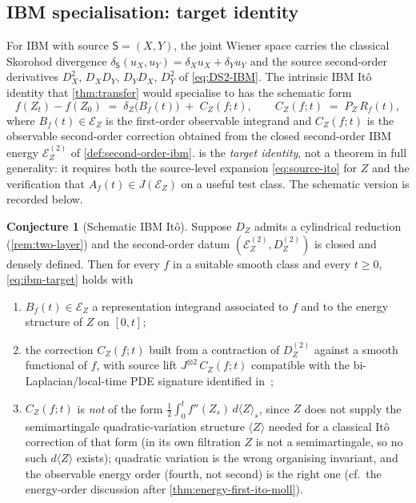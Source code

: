 \documentclass[11pt,reqno]{amsart}
\theoremstyle{plain}
\theoremstyle{definition}
\newtheorem{conjecture}[theorem]{Conjecture}
\theoremstyle{remark}
\newcommand{\Energy}{\mathcal{E}}
\newcommand{\Source}{\mathsf{S}}
\newcommand{\IBM}{Z}
\begin{document}
\subsection*{IBM specialisation: target identity}

For IBM with source $\Source=(X,Y)$, the joint Wiener space carries
the classical Skorohod divergence $\delta_\Source(u_X,u_Y)=\delta_Xu_X
+\delta_Yu_Y$ and the source second-order derivatives $D_X^{2}$,
$D_XD_Y$, $D_YD_X$, $D_Y^{2}$ of \eqref{eq:DS2-IBM}. The intrinsic IBM
It\^o identity that \cref{thm:transfer} would specialise to has the
schematic form
\begin{equation}\label{eq:ibm-target}
  f(\IBM_t)-f(\IBM_0)
  \;=\;\delta_\IBM\bigl(B_f(t)\bigr)\;+\;C_\IBM(f;t),
  \qquad C_\IBM(f;t)\;=\;P_\IBM\,R_f(t),
\end{equation}
where $B_f(t)\in\Energy_\IBM$ is the first-order observable integrand
and $C_\IBM(f;t)$ is the observable second-order correction obtained
from the closed second-order IBM energy $\Energy_\IBM^{(2)}$ of
\cref{def:second-order-ibm}.  is the
\emph{target identity}, not a theorem in full generality: it requires
both the source-level expansion \eqref{eq:source-ito} for $\IBM$ and
the verification that $A_f(t)\in J(\Energy_\IBM)$ on a useful test
class. The schematic version is recorded below.

\begin{conjecture}[Schematic IBM It\^o]\label{conj:ibm-ito}
Suppose $D_\IBM$ admits a cylindrical reduction
(\cref{rem:two-layer}) and the second-order datum
$(\Energy_\IBM^{(2)},D_\IBM^{(2)})$ is closed and densely defined.
Then for every $f$ in a suitable smooth class and every $t\ge 0$,
\eqref{eq:ibm-target} holds with
\begin{enumerate}
\item $B_f(t)\in\Energy_\IBM$ a representation integrand associated
  to $f$ and to the energy structure of $\IBM$ on $[0,t]$;
\item the correction $C_\IBM(f;t)$ built from a contraction of
  $D_\IBM^{(2)}$ against a smooth functional of $f$, with source lift
  $J^{\otimes 2}\,C_\IBM(f;t)$ compatible with the
  bi-Laplacian/local-time PDE signature identified
  in~\cite{AllouZheng};
\item $C_\IBM(f;t)$ is \emph{not} of the form
  $\tfrac12\int_{0}^{t}f''(\IBM_{s})\,d\langle\IBM\rangle_{s}$, since
  $\IBM$ does not supply the semimartingale quadratic-variation
  structure $\langle\IBM\rangle$ needed for a classical It\^o
  correction of that form (in its own filtration $\IBM$ is not a
  semimartingale, so no such $d\langle\IBM\rangle$ exists);
  quadratic variation is the wrong organising invariant, and the
  observable energy order (fourth, not second) is the right one
  (cf.~the energy-order discussion after
  \cref{thm:energy-first-ito-moll}).
\end{enumerate}
\end{conjecture}
\end{document}
